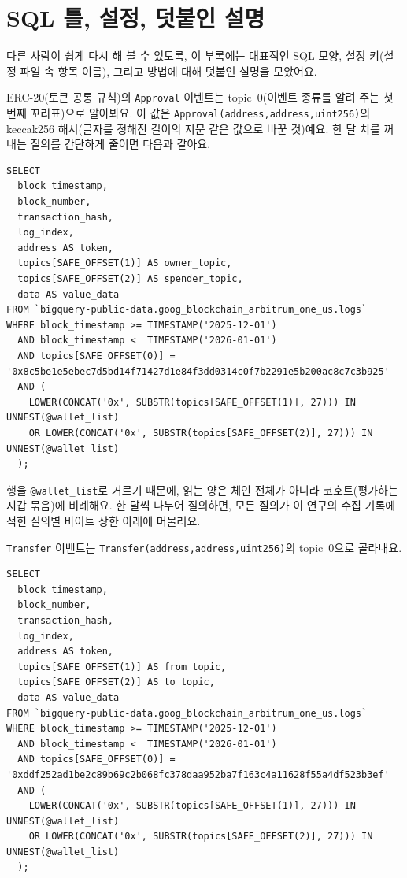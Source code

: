 \section{SQL 틀, 설정, 덧붙인 설명}
\label{ch:appendix-sql}

다른 사람이 쉽게 다시 해 볼 수 있도록, 이 부록에는 대표적인 SQL 모양, 설정 키(설정 파일 속 항목 이름), 그리고 방법에 대해 덧붙인 설명을 모았어요.


ERC-20(토큰 공통 규칙)의 \texttt{Approval} 이벤트는 topic~$0$(이벤트 종류를 알려 주는 첫 번째 꼬리표)으로 알아봐요. 이 값은 \texttt{Approval(address,address,uint256)}의 keccak256 해시(글자를 정해진 길이의 지문 같은 값으로 바꾼 것)예요. 한 달 치를 꺼내는 질의를 간단하게 줄이면 다음과 같아요.

\begin{verbatim}
SELECT
  block_timestamp,
  block_number,
  transaction_hash,
  log_index,
  address AS token,
  topics[SAFE_OFFSET(1)] AS owner_topic,
  topics[SAFE_OFFSET(2)] AS spender_topic,
  data AS value_data
FROM `bigquery-public-data.goog_blockchain_arbitrum_one_us.logs`
WHERE block_timestamp >= TIMESTAMP('2025-12-01')
  AND block_timestamp <  TIMESTAMP('2026-01-01')
  AND topics[SAFE_OFFSET(0)] = '0x8c5be1e5ebec7d5bd14f71427d1e84f3dd0314c0f7b2291e5b200ac8c7c3b925'
  AND (
    LOWER(CONCAT('0x', SUBSTR(topics[SAFE_OFFSET(1)], 27))) IN UNNEST(@wallet_list)
    OR LOWER(CONCAT('0x', SUBSTR(topics[SAFE_OFFSET(2)], 27))) IN UNNEST(@wallet_list)
  );
\end{verbatim}

행을 \texttt{@wallet\_list}로 거르기 때문에, 읽는 양은 체인 전체가 아니라 코호트(평가하는 지갑 묶음)에 비례해요. 한 달씩 나누어 질의하면, 모든 질의가 이 연구의 수집 기록에 적힌 질의별 바이트 상한 아래에 머물러요.


\texttt{Transfer} 이벤트는 \texttt{Transfer(address,address,uint256)}의 topic~$0$으로 골라내요.

\begin{verbatim}
SELECT
  block_timestamp,
  block_number,
  transaction_hash,
  log_index,
  address AS token,
  topics[SAFE_OFFSET(1)] AS from_topic,
  topics[SAFE_OFFSET(2)] AS to_topic,
  data AS value_data
FROM `bigquery-public-data.goog_blockchain_arbitrum_one_us.logs`
WHERE block_timestamp >= TIMESTAMP('2025-12-01')
  AND block_timestamp <  TIMESTAMP('2026-01-01')
  AND topics[SAFE_OFFSET(0)] = '0xddf252ad1be2c89b69c2b068fc378daa952ba7f163c4a11628f55a4df523b3ef'
  AND (
    LOWER(CONCAT('0x', SUBSTR(topics[SAFE_OFFSET(1)], 27))) IN UNNEST(@wallet_list)
    OR LOWER(CONCAT('0x', SUBSTR(topics[SAFE_OFFSET(2)], 27))) IN UNNEST(@wallet_list)
  );
\end{verbatim}

